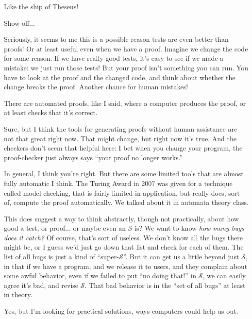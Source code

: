 \documentclass[sigplan]{acmart}
\begin{document}
  Like the ship of Theseus!

 Show-off... 

  Seriously, it seems to me this is a possible reason
tests are even better than proofs!  Or at least useful even when we have a proof.
Imagine we change the code for some reason.  If we have really good tests, it's
easy to see if we made a mistake: we just run those tests!  But your
proof isn't something you can run.   You have to look at the proof and
the changed code, and think about whether the change breaks the
proof.  Another chance for human mistakes!

 There are automated proofs, like I said,
where a
computer produces the proof, or at least checks that it's correct.

 Sure, but I think the tools for generating
proofs without human assistance are not that great right now.  That
might change, but right now it's true.  And the checkers don't seem
that helpful here:  I bet when you change your program, the
proof-checker just always says ``your proof no longer works.''

   In general, I think you're right. But
there are some limited tools that are almost fully automatic I think.
The Turing Award in 2007 was given for a technique called model
checking, that is fairly limited in application, but really does, sort of,
compute the proof automatically.  We talked about it in automata
theory class.

  This does suggest a way to think
abstractly, though not practically, about how good a test, or proof...
or maybe even an $\mathcal{S}$ is?  We want to know \emph{how many bugs does
  it catch?}  Of course, that's sort of useless.  We don't know all
the bugs there might be, or I guess we'd just go down that list and
check for each of them.  The list of all bugs is just a kind of ``super-$\mathcal{S}$''.  But it can get us a little beyond just
$\mathcal{S}$, in that if we have a program, and we release it to
users, and they complain about some awful behavior, even if we failed
to put ``no doing that!'' in $\mathcal{S}$, we can easily agree it's
bad, and revise $\mathcal{S}$.  That bad behavior is in the ``set of
all bugs'' at least in theory.

  Yes, but I'm looking for practical
solutions, ways computers could help us out.
\end{document}
